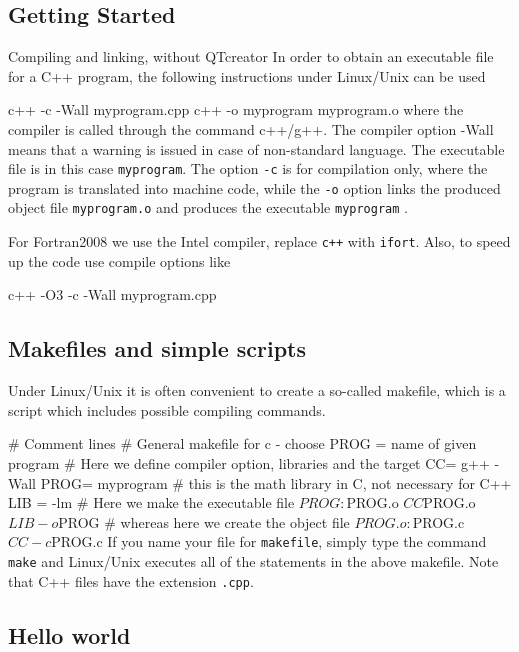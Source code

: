\documentclass[%
oneside,                 %
final,                   %
10pt]{article}
\begin{document}
\subsection{Getting Started}

\begin{block}{Compiling and linking, without QTcreator }
In order to obtain an executable file for a C++ program, the following
instructions under Linux/Unix can be used

\bsys
c++ -c -Wall myprogram.cpp
c++ -o myprogram myprogram.o
\esys
where the compiler is called through the command c++/g++. The compiler
option -Wall means that a warning is issued in case of non-standard
language. The executable file is in this case \Verb!myprogram!. The option
\Verb!-c! is for compilation only, where the program is translated into machine code,
while the \Verb!-o! option links the produced object file \Verb!myprogram.o!
and produces the executable \Verb!myprogram! .

For Fortran2008 we use the Intel compiler, replace \Verb!c++! with \Verb!ifort!.
Also, to speed up the code use compile options like

\bsys
c++ -O3 -c -Wall myprogram.cpp
\esys
\end{block}

\subsection{Makefiles and simple scripts}

Under Linux/Unix it is often convenient to create a
so-called makefile, which is a script which includes possible
compiling commands.

\bcppcod
# Comment lines
# General makefile for c - choose PROG =   name of given program
# Here we define compiler option, libraries and the  target
CC= g++ -Wall
PROG= myprogram
# this is the math library in C, not necessary for C++
LIB = -lm
# Here we make the executable file
${PROG} :          ${PROG}.o
                   ${CC} ${PROG}.o ${LIB} -o ${PROG}
# whereas here we create the object file
${PROG}.o :       ${PROG}.c
                  ${CC} -c ${PROG}.c
\ecppcod
If you name your file for \Verb!makefile!, simply type the command
\Verb!make! and Linux/Unix executes all of the statements in the above
makefile. Note that C++ files have the extension \Verb!.cpp!.

\subsection{Hello world}
\end{document}
